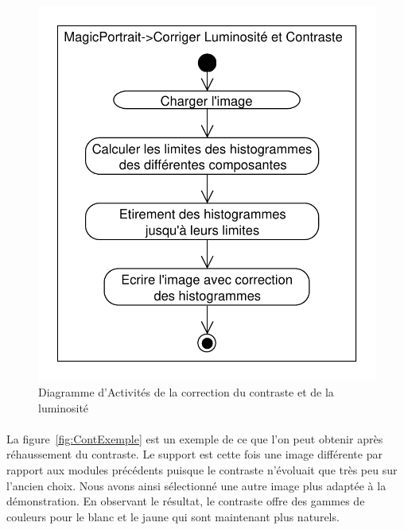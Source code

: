 \documentclass[11pt, french]{report-rd-info}
\begin{document}
\begin{figure}
\centering
\includegraphics[scale=0.5]{Diagrammes/DiagrammeActivites_30_Contraste}
\caption{Diagramme d'Activités de la correction du contraste et de la luminosité}
\label{diag:diagramme30}
\end{figure}

\paragraph*{}
La figure~\ref{fig:ContExemple} est un exemple de ce que l'on peut obtenir après réhaussement du contraste. Le support est cette fois une image différente par rapport aux modules précédents puisque le contraste n'évoluait que très peu sur l'ancien choix. Nous avons ainsi sélectionné une autre image plus adaptée à la démonstration. En observant le résultat, le contraste offre des gammes de couleurs pour le blanc et le jaune qui sont maintenant plus naturels.
\end{document}
